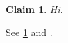 \documentclass{article}
\newtheorem{claim}{Claim}
\begin{document}
\begin{claim}\label{cl:1}
Hi.
\end{claim}
See \cref{cl:1} and .
\end{document}
